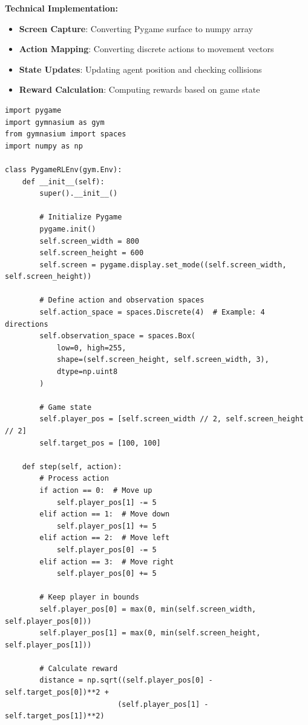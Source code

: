 \documentclass[12pt]{article}
\begin{document}
{{{\textbf{Technical Implementation:}
\begin{itemize}
    \item \textbf{Screen Capture}: Converting Pygame surface to numpy array
    \item \textbf{Action Mapping}: Converting discrete actions to movement vectors
    \item \textbf{State Updates}: Updating agent position and checking collisions
    \item \textbf{Reward Calculation}: Computing rewards based on game state
\end{itemize}

\begin{verbatim}
import pygame
import gymnasium as gym
from gymnasium import spaces
import numpy as np

class PygameRLEnv(gym.Env):
    def __init__(self):
        super().__init__()
        
        # Initialize Pygame
        pygame.init()
        self.screen_width = 800
        self.screen_height = 600
        self.screen = pygame.display.set_mode((self.screen_width, self.screen_height))
        
        # Define action and observation spaces
        self.action_space = spaces.Discrete(4)  # Example: 4 directions
        self.observation_space = spaces.Box(
            low=0, high=255, 
            shape=(self.screen_height, self.screen_width, 3), 
            dtype=np.uint8
        )
        
        # Game state
        self.player_pos = [self.screen_width // 2, self.screen_height // 2]
        self.target_pos = [100, 100]
        
    def step(self, action):
        # Process action
        if action == 0:  # Move up
            self.player_pos[1] -= 5
        elif action == 1:  # Move down
            self.player_pos[1] += 5
        elif action == 2:  # Move left
            self.player_pos[0] -= 5
        elif action == 3:  # Move right
            self.player_pos[0] += 5
            
        # Keep player in bounds
        self.player_pos[0] = max(0, min(self.screen_width, self.player_pos[0]))
        self.player_pos[1] = max(0, min(self.screen_height, self.player_pos[1]))
        
        # Calculate reward
        distance = np.sqrt((self.player_pos[0] - self.target_pos[0])**2 + 
                          (self.player_pos[1] - self.target_pos[1])**2)
        

\end{verbatim}}}}
\end{document}
